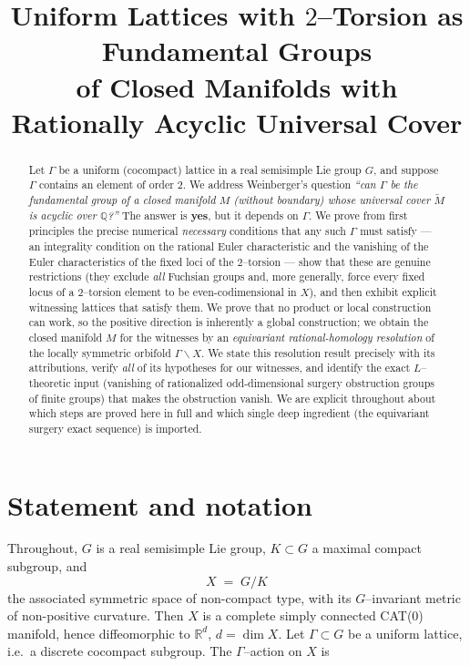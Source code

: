 \documentclass[12pt]{article}
\title{Uniform Lattices with $2$--Torsion as Fundamental Groups\\
of Closed Manifolds with Rationally Acyclic Universal Cover}
\author{}
\date{}
\newcommand{\bR}{\mathbb{R}}
\newcommand{\bQ}{\mathbb{Q}}
\theoremstyle{definition}
\begin{document}
\maketitle

\begin{abstract}
Let $\Gamma$ be a uniform (cocompact) lattice in a real semisimple Lie group $G$,
and suppose $\Gamma$ contains an element of order $2$.  We address Weinberger's
question \emph{``can $\Gamma$ be the fundamental group of a closed manifold $M$
(without boundary) whose universal cover $\widetilde M$ is acyclic over $\bQ$?''}
The answer is \textbf{yes}, but it depends on $\Gamma$.  We prove from first
principles the precise numerical \emph{necessary} conditions that any such
$\Gamma$ must satisfy --- an integrality condition on the rational Euler
characteristic and the vanishing of the Euler characteristics of the fixed loci
of the $2$--torsion --- show that these are genuine restrictions (they exclude
\emph{all} Fuchsian groups and, more generally, force every fixed locus of a
$2$--torsion element to be even-codimensional in $X$), and then exhibit explicit
witnessing lattices that satisfy them.  We prove that no product or local
construction can work, so the positive direction is inherently a global
construction; we obtain the closed manifold $M$ for the witnesses by an
\emph{equivariant rational-homology resolution} of the locally symmetric orbifold
$\Gamma\backslash X$.  We state this resolution result precisely with its
attributions, verify \emph{all} of its hypotheses for our witnesses, and identify
the exact $L$--theoretic input (vanishing of rationalized odd-dimensional surgery
obstruction groups of finite groups) that makes the obstruction vanish.  We are
explicit throughout about which steps are proved here in full and which single
deep ingredient (the equivariant surgery exact sequence) is imported.
\end{abstract}

\section{Statement and notation}

Throughout, $G$ is a real semisimple Lie group, $K\subset G$ a maximal compact
subgroup, and
\[
   X \;=\; G/K
\]
the associated symmetric space of non-compact type, with its $G$--invariant
metric of non-positive curvature.  Then $X$ is a complete simply connected
CAT($0$) manifold, hence diffeomorphic to $\bR^{d}$, $d=\dim X$.  Let
$\Gamma\subset G$ be a uniform lattice, i.e.\ a discrete cocompact subgroup.  The
$\Gamma$--action on $X$ is
\end{document}
